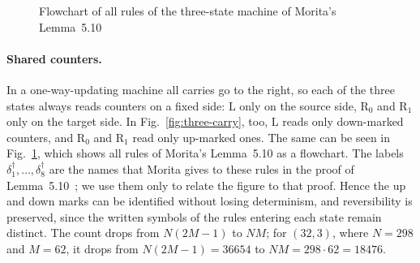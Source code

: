 \documentclass{article}
\theoremstyle{definition}
\theoremstyle{remark}
\newcommand{\rmL}{\mathrm{L}}
\newcommand{\rmR}{\mathrm{R}}
\begin{document}
\begin{figure}[tb]
\centering
{}
\caption{Flowchart of all rules of the three-state machine of Morita's Lemma~5.10~\cite{Morita17}}
\label{fig:dagger-flow}
\end{figure}

\paragraph{Shared counters.}
In a one-way-updating machine all carries go to the right, so each of the three states always reads counters on a fixed side: $\rmL$ only on the source side, $\rmR_0$ and $\rmR_1$ only on the target side.
In Fig.~\ref{fig:three-carry}, too, $\rmL$ reads only down-marked counters, and $\rmR_0$ and $\rmR_1$ read only up-marked ones.
The same can be seen in Fig.~\ref{fig:dagger-flow}, which shows all rules of Morita's Lemma~5.10 as a flowchart. The labels $\delta^\dagger_1,\dots,\delta^\dagger_8$ are the names that Morita gives to these rules in the proof of Lemma~5.10~\cite{Morita17}; we use them only to relate the figure to that proof.
Hence the up and down marks can be identified without losing determinism, and reversibility is preserved, since the written symbols of the rules entering each state remain distinct.
The count drops from $N(2M-1)$ to $NM$; for $(32,3)$, where $N=298$ and $M=62$, it drops from $N(2M-1)=36654$ to $NM=298\cdot 62=18476$.
\end{document}

